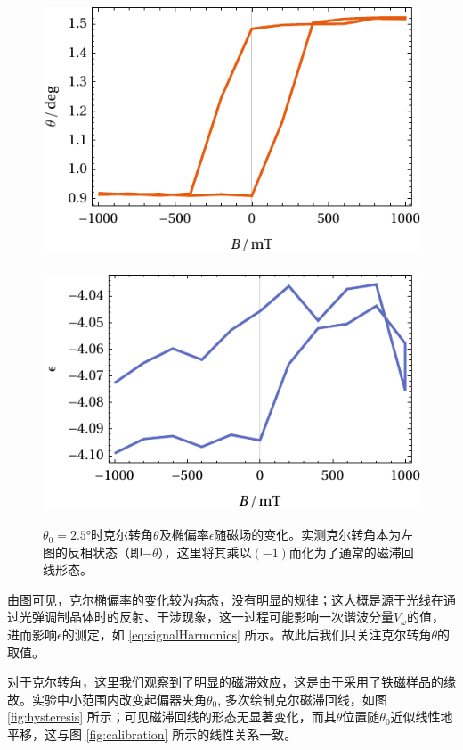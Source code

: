\documentclass[aps,pre,12pt,preprint,%
	onecolumn,showpacs,showkeys,nofootinbib]{revtex4-1}
\begin{document}
	\begin{figure}[!ht]
		\centering\small
		\newcommand{\figheight}{.28\linewidth}
		\includegraphics[height=\figheight]{data/plots/sampleTheta.pdf}\ 
		\includegraphics[height=\figheight]{data/plots/sampleEpsilon.pdf}
		\hspace{1.5em}
		\caption[$\theta_0 = \ang{2.5}$时克尔转角及椭偏率随磁场的变化]{
			$\theta_0 = \ang{2.5}$时克尔转角$\theta$及椭偏率$\epsilon$随磁场的变化。实测克尔转角本为左图的反相状态（即$-\theta$），这里将其乘以$(-1)$而化为了通常的磁滞回线形态。
		}
		\label{fig:sampleData}
	\end{figure}
	
	由图可见，克尔椭偏率的变化较为病态，没有明显的规律；这大概是源于光线在通过光弹调制晶体时的反射、干涉现象，这一过程可能影响一次谐波分量$V_\omega$的值，进而影响$\epsilon$的测定，如 \eqref{eq:signalHarmonics} 所示。故此后我们只关注克尔转角$\theta$的取值。
	
	对于克尔转角，这里我们观察到了明显的磁滞效应，这是由于采用了铁磁样品的缘故。实验中小范围内改变起偏器夹角$\theta_0$, 多次绘制克尔磁滞回线，如图 \ref{fig:hysteresis} 所示；可见磁滞回线的形态无显著变化，而其$\theta$位置随$\theta_0$近似线性地平移，这与图 \ref{fig:calibration} 所示的线性关系一致。
	
\end{document}
